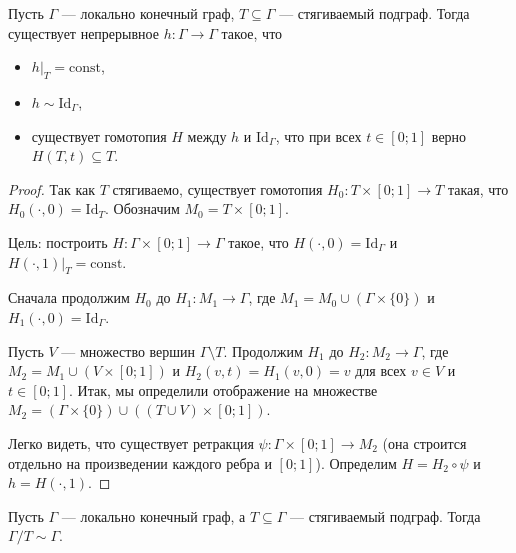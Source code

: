\documentclass[12pt,a4paper]{article}
\newcommand{\const}{\ensuremath{\mathrm{const}}\xspace}
\newcommand{\Id}{\ensuremath{\mathrm{Id}}\xspace}
\begin{document}
    \begin{lemma}
        Пусть $\Gamma$ --- локально конечный граф, $T \subseteq \Gamma$ --- стягиваемый подграф. Тогда существует непрерывное $h: \Gamma \to \Gamma$ такое, что
        \begin{itemize}
            \item $h|_T = \const$,
            \item $h \sim \Id_\Gamma$,
            \item существует гомотопия $H$ между $h$ и $\Id_\Gamma$, что при всех $t \in [0; 1]$ верно $H(T, t) \subseteq T$.
        \end{itemize}
    \end{lemma}

    \begin{proof}
        Так как $T$ стягиваемо, существует гомотопия $H_0: T \times [0; 1] \to T$ такая, что $H_0({\cdot}, 0) = \Id_T$. Обозначим $M_0 = T \times [0; 1]$.
        
        Цель: построить $H: \Gamma \times [0; 1] \to \Gamma$ такое, что $H({\cdot}, 0) = \Id_\Gamma$ и $H({\cdot}, 1)|_T = \const$.
        
        Сначала продолжим $H_0$ до $H_1: M_1 \to \Gamma$, где $M_1 = M_0 \cup (\Gamma \times \{0\})$ и $H_1({\cdot}, 0) = \Id_\Gamma$.

        Пусть $V$ --- множество вершин $\Gamma \setminus T$. Продолжим $H_1$ до $H_2: M_2 \to \Gamma$, где $M_2 = M_1 \cup (V \times [0; 1])$ и $H_2(v, t) = H_1(v, 0) = v$ для всех $v \in V$ и $t \in [0; 1]$. Итак, мы определили отображение на множестве $M_2 = (\Gamma \times \{0\}) \cup ((T \cup V) \times [0; 1])$.

        Легко видеть, что существует ретракция $\psi: \Gamma \times [0; 1] \to M_2$ (она строится отдельно на произведении каждого ребра и $[0; 1]$). Определим $H = H_2 \circ \psi$ и $h = H({\cdot}, 1)$.
    \end{proof}

    \begin{theorem}
        Пусть $\Gamma$ --- локально конечный граф, а $T \subseteq \Gamma$ --- стягиваемый подграф. Тогда $\Gamma/T \sim \Gamma$.
    \end{theorem}
\end{document}
